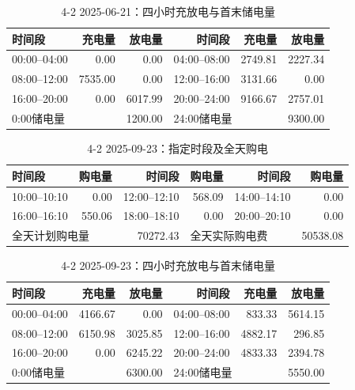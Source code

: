 \begin{table}[htbp]\centering\scriptsize
\caption{4-2 2025-06-21：四小时充放电与首末储电量}
\begin{tabular}{lrrrrr}\toprule
时间段 & 充电量 & 放电量 & 时间段 & 充电量 & 放电量\\\midrule
00:00--04:00 & 0.00 & 0.00 & 04:00--08:00 & 2749.81 & 2227.34\\
08:00--12:00 & 7535.00 & 0.00 & 12:00--16:00 & 3131.66 & 0.00\\
16:00--20:00 & 0.00 & 6017.99 & 20:00--24:00 & 9166.67 & 2757.01\\
\multicolumn{2}{l}{0:00储电量} & 1200.00 & \multicolumn{2}{l}{24:00储电量} & 9300.00\\
\bottomrule\end{tabular}\end{table}

\FloatBarrier
\begin{table}[htbp]\centering\scriptsize
\caption{4-2 2025-09-23：指定时段及全天购电}
\begin{tabular}{lrrrrr}\toprule
时间段 & 购电量 & 时间段 & 购电量 & 时间段 & 购电量\\\midrule
10:00--10:10 & 0.00 & 12:00--12:10 & 568.09 & 14:00--14:10 & 0.00\\
16:00--16:10 & 550.06 & 18:00--18:10 & 0.00 & 20:00--20:10 & 0.00\\
\multicolumn{2}{l}{全天计划购电量} & 70272.43 & \multicolumn{2}{l}{全天实际购电费} & 50538.08\\
\bottomrule\end{tabular}\end{table}

\begin{table}[htbp]\centering\scriptsize
\caption{4-2 2025-09-23：四小时充放电与首末储电量}
\begin{tabular}{lrrrrr}\toprule
时间段 & 充电量 & 放电量 & 时间段 & 充电量 & 放电量\\\midrule
00:00--04:00 & 4166.67 & 0.00 & 04:00--08:00 & 833.33 & 5614.15\\
08:00--12:00 & 6150.98 & 3025.85 & 12:00--16:00 & 4882.17 & 296.85\\
16:00--20:00 & 0.00 & 6245.22 & 20:00--24:00 & 4833.33 & 2394.78\\
\multicolumn{2}{l}{0:00储电量} & 6300.00 & \multicolumn{2}{l}{24:00储电量} & 5550.00\\
\bottomrule\end{tabular}\end{table}


